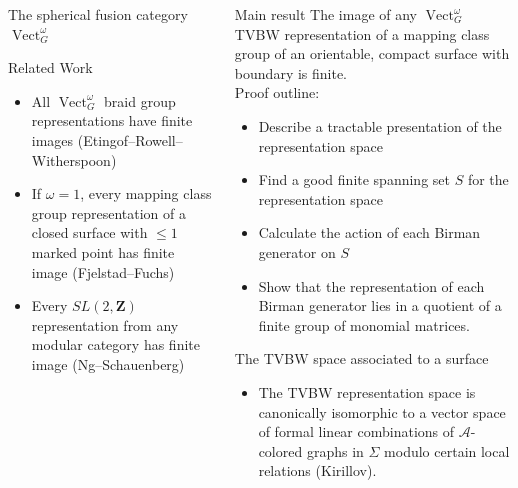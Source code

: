 \documentclass[final,t, mathserif]{beamer}
\DeclareMathOperator{\Vect}{Vect}
\theoremstyle{plain}
\theoremstyle{definition}
\begin{document}
\begin{frame}{}
\begin{columns}[t]
\begin{column}{.3\linewidth}
\begin{block}{The spherical fusion category $\Vect^\omega_G$}
\end{block}


\begin{block}{Related Work}
  \begin{itemize}
  \item All $\Vect_G^\omega$ braid group representations have finite images (Etingof--Rowell--Witherspoon)

  \item  If $\omega = 1$, every mapping class group representation of a closed surface with $\le 1$ marked point has finite image
(Fjelstad--Fuchs)

  \item Every $SL(2,\mathbf{Z})$ representation from any modular category has finite image (Ng--Schauenberg)
  \end{itemize}
\end{block}

\end{column}
\begin{column}{.3\linewidth}




\begin{block}{Main result}
The image of any $\Vect^\omega_G$ TVBW representation of a mapping class group of an orientable, compact surface with boundary is finite.
\\ \vspace{1cm}
Proof outline:
\begin{itemize}
  \item Describe a tractable presentation of  the representation space
  \item Find a good finite spanning set $S$ for the representation space
  \item Calculate the action of each Birman generator on $S$
  \item Show that the representation of each Birman generator lies in a quotient of a finite group of monomial matrices.  
\end{itemize}
\end{block}

\begin{block}{The TVBW space associated to a surface}
  \begin{itemize}
    \item 
        The TVBW representation space is canonically isomorphic to
        a vector space of formal linear combinations of $\mathcal A$-colored graphs in $\Sigma$  modulo certain local relations (Kirillov).
      

\end{itemize}
\end{block}
\end{column}
\end{columns}
\end{frame}
\end{document}
